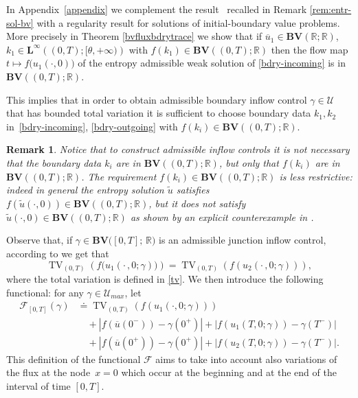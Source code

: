 \documentclass[a4paper, 10pt, final]{article}
\newtheorem{remark}{Remark}[section]
\newcommand{\R}{\mathbb{R}} \newcommand{\N}{\mathbb{N}}
\DeclareMathOperator{\tv}{TV}
\begin{document}
In  Appendix~\ref{appendix} we complement the  result~\cite[Theorem 1.1]{marconi1} recalled in  Remark \ref{rem:entr-sol-bv} with  a regularity result
for solutions of initial-boundary value problems. 
More precisely in Theorem \ref{bvfluxbdrytrace} 
we show that if  $\overline u_1\in \mathbf{BV} (\R; \R)$,  
$k_1 \in \mathbf{L^\infty}\left((0,T); [\theta,+\infty) \right)$  with 
$f(k_1)\in \mathbf{BV}((0,T); \R)$
then the flow map 
$t\mapsto   f\big(u_1(\cdot, 0)\big)$ of the  entropy admissible weak solution of \eqref{bdry-incoming}
is in $\mathbf{BV}((0,T); \R)$.

This implies that in order to obtain  admissible  boundary inflow control $\gamma\in \mathcal{U}$ 
that has bounded total variation it is sufficient to choose boundary data $k_1, k_2$ 
in~\eqref{bdry-incoming}, \eqref{bdry-outgoing} with $f(k_i)\in \mathbf{BV}((0,T); \R)$. 
 
 
\begin{remark}\upshape
  Notice that to construct  admissible inflow controls it is not necessary that the boundary data  $k_i$ 
  are in  $\mathbf{BV}((0,T); \R)$, but only that $f(k_i)$ are in $\mathbf{BV}((0,T); \R)$. 
  The requirement $f(k_i)\in\mathbf{BV}((0, T); \R)$ is less restrictive: 
  indeed in general the entropy solution $\widetilde u$ satisfies $f(\widetilde u(\cdot,0))\in \mathbf{BV}((0, T); \R)$,
  but it does not satisfy $\widetilde u(\cdot,0)\in \mathbf{BV}((0, T); \R)$ as shown by an explicit counterexample 
  in \cite{marconi1}.
\end{remark} 


Observe that, if $\gamma \in \mathbf{BV}   \big([0,T];\, \R \big)$ is an admissible junction inflow control,
  according to   we get that 
\[\tv_{(0, T)}(f\big(u_1(\cdot\,, 0; \gamma)\big))=\tv_{(0, T)}(f(u_2(\cdot\,, 0;\gamma))),   \] 
 where the total variation is defined in \eqref{tv}. 
We then introduce the following functional: for %
any    $\gamma\in \mathcal{U}_{max}$, let 
\begin{align}
  \label{tv-def}
  \mathcal F_{[0, T]}(\gamma)
  & \doteq \tv_{(0, T)}(f(u_1(\cdot, 0;\gamma)))  
  \\ 
  \nonumber &\quad +|f(\overline u(0^-))- \gamma(0^+)|+|f(u_1(T,0; \gamma))
  - \gamma(T^-)|
  \\
  \nonumber &\quad+|f(\overline u(0^+))- \gamma(0^+)|+|f(u_2(T,0; \gamma))- \gamma(T^-)|.
\end{align}
This definition of the  functional $\mathcal{F}$ aims to take into account  also variations of  
the flux at the node~$x=0$ which occur at the beginning and at the end of the interval of time $[0,T]$. 
\end{document}
